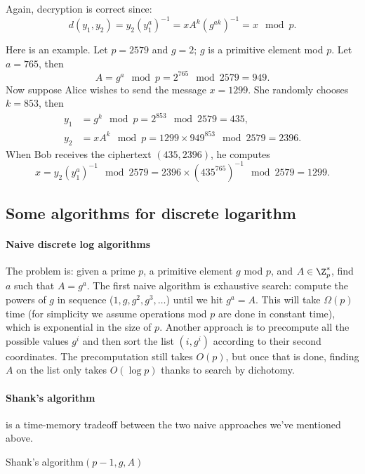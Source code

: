 \documentclass[a4paper, 11pt, openany]{book}
\begin{document}
Again, decryption is correct since:
\[
    d(y_1, y_2) = y_2 (y_1^a)^{-1} = x A^k (g^{ak})^{-1} = x \mod p.
\]

Here is an example. Let $p = 2579$ and $g = 2$; $g$ is a primitive element mod $p$. Let $a = 765$, then
\[
    A = g^a \mod p = 2^{765} \mod 2579 = 949.
\]
Now suppose Alice wishes to send the message $x = 1299$. She randomly chooses $k = 853$, then
\begin{align*}
    y_1 &= g^k \mod p = 2^{853} \mod 2579 = 435,\\
    y_2 &= x A^k \mod p = 1299 \times 949^{853} \mod 2579 = 2396.
\end{align*}
When Bob receives the ciphertext $(435, 2396)$, he computes
\[
    x = y_2 ( y_1^a )^{-1} \mod 2579 = 2396 \times ( 435^{765} )^{-1} \mod 2579 = 1299.
\]



\subsection{Some algorithms for discrete logarithm}


\paragraph{Naive discrete log algorithms}
The problem is: given a prime $p$, a primitive element $g$ mod $p$, and $A \in \Z_p^*$, find $a$ such that $A = g^a$. The first naive algorithm is exhaustive search: compute the powers of $g$ in sequence ($1, g, g^2, g^3, \dots$) until we hit $g^a = A$. This will take $\Omega(p)$ time (for simplicity we assume operations mod $p$ are done in constant time), which is exponential in the size of $p$. Another approach is to precompute all the possible values $g^i$ and then sort the list $(i,g^i)$ according to their second coordinates. The precomputation still takes $O(p)$, but once that is done, finding $A$ on the list only takes $O(\log p)$ thanks to search by dichotomy.

\paragraph{Shank's algorithm}
 is a time-memory tradeoff between the two naive approaches we've mentioned above.

\begin{algorithm}[H]
\caption{Shank's algorithm$(p-1,g,A)$}
\begin{algorithmic}[1]
    \EndFor
    \EndFor
\end{algorithmic}
\end{algorithm}
\end{document}
